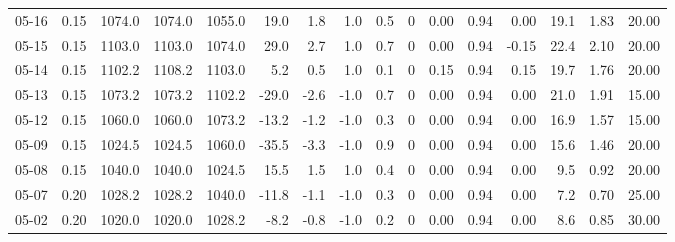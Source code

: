 \begin{threeparttable}
{\begin{tabular}{lrrrrrrrrrrrrrrr}
  05-16 &     0.15 & 1074.0 & 1074.0 & 1055.0 &       19.0 &            1.8 &                      1.0 &                 0.5 &              0 &       0.00 &      0.94 &           0.00 &             19.1 &            1.83 &                  20.00 \\
  05-15 &     0.15 & 1103.0 & 1103.0 & 1074.0 &       29.0 &            2.7 &                      1.0 &                 0.7 &              0 &       0.00 &      0.94 &          -0.15 &             22.4 &            2.10 &                  20.00 \\
  05-14 &     0.15 & 1102.2 & 1108.2 & 1103.0 &        5.2 &            0.5 &                      1.0 &                 0.1 &              0 &       0.15 &      0.94 &           0.15 &             19.7 &            1.76 &                  20.00 \\
  05-13 &     0.15 & 1073.2 & 1073.2 & 1102.2 &      -29.0 &           -2.6 &                     -1.0 &                 0.7 &              0 &       0.00 &      0.94 &           0.00 &             21.0 &            1.91 &                  15.00 \\
  05-12 &     0.15 & 1060.0 & 1060.0 & 1073.2 &      -13.2 &           -1.2 &                     -1.0 &                 0.3 &              0 &       0.00 &      0.94 &           0.00 &             16.9 &            1.57 &                  15.00 \\
  05-09 &     0.15 & 1024.5 & 1024.5 & 1060.0 &      -35.5 &           -3.3 &                     -1.0 &                 0.9 &              0 &       0.00 &      0.94 &           0.00 &             15.6 &            1.46 &                  20.00 \\
  05-08 &     0.15 & 1040.0 & 1040.0 & 1024.5 &       15.5 &            1.5 &                      1.0 &                 0.4 &              0 &       0.00 &      0.94 &           0.00 &              9.5 &            0.92 &                  20.00 \\
  05-07 &     0.20 & 1028.2 & 1028.2 & 1040.0 &      -11.8 &           -1.1 &                     -1.0 &                 0.3 &              0 &       0.00 &      0.94 &           0.00 &              7.2 &            0.70 &                  25.00 \\
  05-02 &     0.20 & 1020.0 & 1020.0 & 1028.2 &       -8.2 &           -0.8 &                     -1.0 &                 0.2 &              0 &       0.00 &      0.94 &           0.00 &              8.6 &            0.85 &                  30.00 \\

\end{tabular}}
\end{threeparttable}
